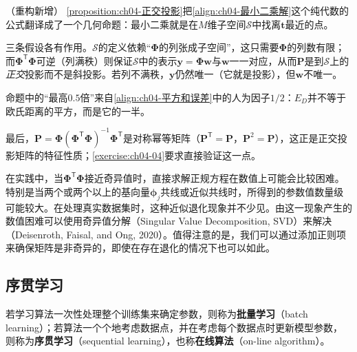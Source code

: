 \documentclass[../../main.tex]{subfiles}
\begin{document}
\begin{remark}（重构新增）
\cref{proposition:ch04-正交投影}把\eqref{align:ch04-最小二乘解}这个纯代数的公式翻译成了一个几何命题：最小二乘就是在$M$维子空间$\mathcal{S}$中找离$\boldsymbol{t}$最近的点。

三条假设各有作用。$\mathcal{S}$的定义依赖“$\boldsymbol{\Phi}$的列张成子空间”，这只需要$\boldsymbol{\Phi}$的列数有限；而$\boldsymbol{\Phi}^{\mathsf{T}}\boldsymbol{\Phi}$可逆（列满秩）则保证$\mathcal{S}$中的表示$\boldsymbol{y}=\boldsymbol{\Phi}\boldsymbol{w}$与$\boldsymbol{w}$一一对应，从而$\boldsymbol{P}$是到$\mathcal{S}$上的\emph{正交}投影而不是斜投影。若列不满秩，$\boldsymbol{y}$仍然唯一（它就是投影），但$\boldsymbol{w}$不唯一。

命题中的“最高$0.5$倍”来自\eqref{align:ch04-平方和误差}中的人为因子$1/2$：$E_D$并不等于欧氏距离的平方，而是它的一半。

最后，$\boldsymbol{P}=\boldsymbol{\Phi}(\boldsymbol{\Phi}^{\mathsf{T}}\boldsymbol{\Phi})^{-1}\boldsymbol{\Phi}^{\mathsf{T}}$是对称幂等矩阵（$\boldsymbol{P}^{\mathsf{T}}=\boldsymbol{P}$，$\boldsymbol{P}^2=\boldsymbol{P}$），这正是正交投影矩阵的特征性质；\cref{exercise:ch04-04}要求直接验证这一点。
\end{remark}

在实践中，当$\boldsymbol{\Phi}^{\mathsf{T}}\boldsymbol{\Phi}$接近奇异值时，直接求解正规方程在数值上可能会比较困难。特别是当两个或两个以上的基向量$\boldsymbol{\phi}_j$共线或近似共线时，所得到的参数值数量级可能较大。在处理真实数据集时，这种近似退化现象并不少见。由这一现象产生的数值困难可以使用奇异值分解（Singular Value Decomposition, SVD）来解决（Deisenroth, Faisal, and Ong, 2020）。值得注意的是，我们可以通过添加正则项来确保矩阵是非奇异的，即使在存在退化的情况下也可以如此。

\subsection{序贯学习}\label{subsection:ch04-序贯学习}

\begin{definition}[批量学习与序贯学习]\label{definition:ch04-批量与序贯学习}
若学习算法一次性处理整个训练集来确定参数，则称为\textbf{批量学习}（batch learning）；若算法一个个地考虑数据点，并在考虑每个数据点时更新模型参数，则称为\textbf{序贯学习}（sequential learning），也称\textbf{在线算法}（on-line algorithm）。
\end{definition}
\end{document}
